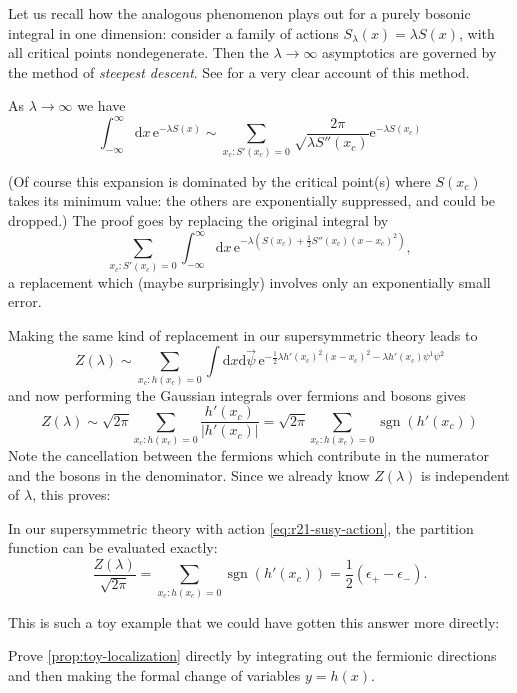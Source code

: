 \documentclass[12pt,letterpaper,reqno]{article}
\numberwithin{equation}{section}
\newcommand{\half}{\ensuremath{\frac{1}{2}}}
\newcommand{\e}{{\mathrm e}}
\newcommand{\de}{\mathrm{d}}
\newcommand{\abs}[1]{\lvert#1\rvert}
\newcommand{\eps}{\epsilon}
\newcommand{\ti}[1]{\textit{#1}}
\DeclareMathOperator{\sgn}{sgn}
\newcommand{\insfig}[2]{

\medskip
\noindent
\begin{minipage}{\linewidth}
\makebox[\linewidth]{\texttt{[image: figures/\#1-crop.pdf]}}
\end{minipage}
\noindent}
\begin{document}
Let us recall how the analogous phenomenon plays out for a purely bosonic
integral in one dimension:
consider a family of actions $S_\lambda(x) = \lambda S(x)$,
with all critical points nondegenerate.
Then the $\lambda \to \infty$ asymptotics 
are governed by the method of \ti{steepest descent}.
See \cite{Bender1999} for a very clear account of this method.
\begin{prop} \label{prop:saddle-expansion-1d-bosonic}
As $\lambda \to \infty$ we have
\begin{equation}
  \int_{-\infty}^\infty \de x \, \e^{-\lambda S(x)} \sim \sum_{x_c: S'(x_c) = 0}
  \sqrt\frac{2 \pi}{\lambda S''(x_c)} \e^{-\lambda S(x_c)}
\end{equation}
\end{prop}
(Of course this expansion is dominated by the critical point(s) where
$S(x_c)$ takes its minimum value: the others are exponentially suppressed,
and could be dropped.)
The proof goes by replacing the original integral by
\begin{equation}
  \sum_{x_c: S'(x_c) = 0} \int_{-\infty}^\infty \de x \, \e^{-\lambda (S(x_c) + \half S''(x_c) (x-x_c)^2)},
\end{equation}
a replacement which (maybe surprisingly) involves only an exponentially small error.

Making the same kind of replacement in our supersymmetric theory leads to
\begin{equation}
  Z(\lambda) \sim \sum_{x_c: h(x_c) = 0} \int \de x \de \vec\psi \, \e^{- \half \lambda h'(x_c)^2 (x-x_c)^2 - \lambda h'(x_c) \psi^1 \psi^2}
\end{equation}
and now performing the Gaussian integrals over fermions and bosons gives
\begin{equation}
  Z(\lambda) \sim \sqrt{2 \pi} \sum_{x_c: h(x_c) = 0} \frac{h'(x_c)}{\abs{h'(x_c)}} = \sqrt{2 \pi} \sum_{x_c: h(x_c) = 0} \sgn(h'(x_c))
\end{equation}
Note the cancellation between the fermions which contribute 
in the numerator and the bosons in the denominator.
Since we already know 
$Z(\lambda)$ is independent of $\lambda$, this proves:
\begin{prop} \label{prop:toy-localization}
In our supersymmetric theory with action \eqref{eq:r21-susy-action},
the partition function can be evaluated exactly:
\begin{equation}
  \frac{Z(\lambda)}{\sqrt{2\pi}} = \sum_{x_c: h(x_c) = 0} \sgn(h'(x_c)) = \half (\eps_+ - \eps_-).
\end{equation}
\end{prop}
\insfig{qft-geometry-15}{0.8}
This is such a toy example that we could have gotten this answer more directly:
\begin{exercise}
Prove \autoref{prop:toy-localization} directly by integrating
out the fermionic directions and then making the formal change of variables
$y = h(x)$.
\end{exercise}
\end{document}
